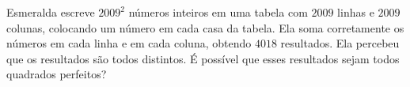 Esmeralda escreve $2009^2$ números inteiros em uma tabela com $2009$ linhas e $2009$ colunas, colocando um número em cada casa da tabela.
Ela soma corretamente os números em cada linha e em cada coluna, obtendo $4018$ resultados.
Ela percebeu que os resultados são todos distintos.
É possível que esses resultados sejam todos quadrados perfeitos?